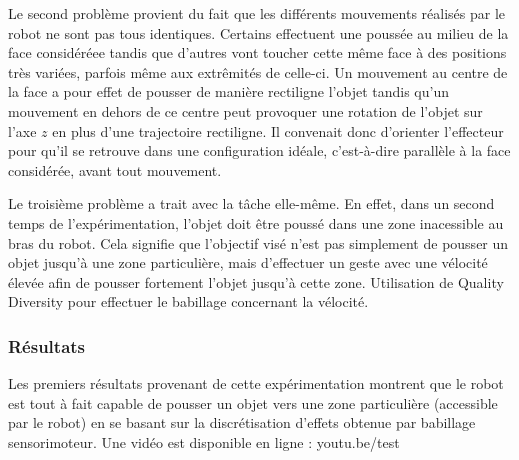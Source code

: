 \documentclass{llncs}
\begin{document}
Le second problème provient du fait que les différents mouvements réalisés par le robot ne sont pas tous identiques. Certains effectuent une poussée au milieu de la face considéréee tandis que d'autres vont toucher cette même face à des positions très variées, parfois même aux extrêmités de celle-ci. Un mouvement au centre de la face a pour effet de pousser de manière rectiligne l'objet tandis qu'un mouvement en dehors de ce centre peut provoquer une rotation de l'objet sur l'axe $z$ en plus d'une trajectoire rectiligne. Il convenait donc d'orienter l'effecteur pour qu'il se retrouve dans une configuration idéale, c'est-à-dire parallèle à la face considérée, avant tout mouvement.

Le troisième problème a trait avec la tâche elle-même. En effet, dans un second temps de l'expérimentation, l'objet doit être poussé dans une zone inacessible au bras du robot. Cela signifie que l'objectif visé n'est pas simplement de pousser  un objet jusqu'à une zone particulière, mais d'effectuer un geste avec une vélocité élevée afin de pousser fortement l'objet jusqu'à cette zone. Utilisation de Quality Diversity pour effectuer le babillage concernant la vélocité.

\subsubsection{Résultats}
Les premiers résultats provenant de cette expérimentation montrent que le robot est tout à fait capable de pousser un objet vers une zone particulière (accessible par le robot) en se basant sur la discrétisation d'effets obtenue par babillage sensorimoteur. Une vidéo est disponible en ligne : youtu.be/test




\end{document}
